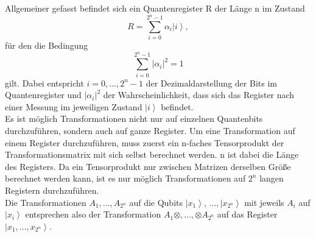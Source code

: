 Allgemeiner gefasst befindet sich ein Quantenregister R der Länge n im Zustand 
$$R=\sum_{i=0}^{2^n-1}{\alpha_i\left|\left.i\right\rangle\right.},$$
für den die Bedingung
$$\sum_{i=0}^{2^n-1}\left|\alpha_i\right|^2=1$$
gilt. Dabei entspricht $i=0,...,2^n-1$ der Dezimaldarstellung der Bits im Quantenregister und $\left|\alpha_i\right|^2$ der Wahrscheinlichkeit, dass sich das Register nach einer Messung im jeweiligen Zustand $\left|\left.i\right\rangle\right.$ befindet.\\

Es ist möglich Transformationen nicht nur auf einzelnen Quantenbits durchzuführen, sondern auch auf ganze Register. Um eine Transformation auf einem Register durchzuführen, muss zuerst ein n-faches Tensorprodukt der Transformationsmatrix mit sich selbst berechnet werden. n ist dabei die Länge des Registers. Da ein Tensorprodukt nur zwischen Matrizen derselben Größe berechnet werden kann, ist es nur möglich Transformationen auf $2^n$ langen Registern durchzuführen. \\

Die Transformationen $A_1,\ldots,A_{2^n}$ auf die Qubits $\left|\left.x_1\right\rangle\right.$, $\ldots,\left|\left.x_{2^n}\right\rangle\right.$ mit jeweils $A_i$ auf $\left|\left.x_i\right\rangle\right.$ entsprechen also der Transformation $A_1\otimes,\ldots,\otimes A_{2^n}$ auf das Register $\left|\left.x_1,\ldots,x_{2^n}\right\rangle\right.$.

